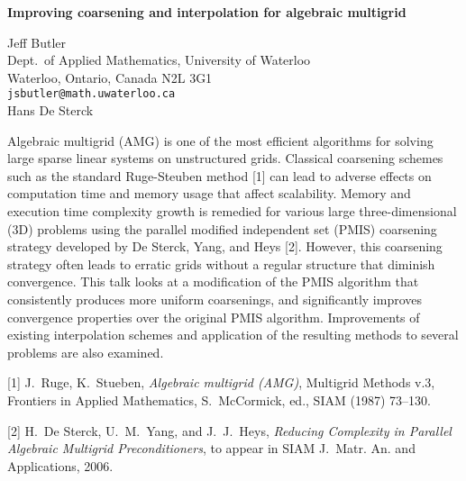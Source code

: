 \documentclass{report}
\begin{document}

\begin{center}
{\large
{\bf Improving coarsening and interpolation for algebraic multigrid}}

	Jeff Butler \\
	Dept.~of Applied Mathematics, University of Waterloo \\
	Waterloo, Ontario, Canada N2L 3G1 \\
	{\tt jsbutler@math.uwaterloo.ca} \\
	Hans De Sterck
\end{center}
Algebraic multigrid (AMG) is one of the most efficient
algorithms for solving large sparse linear systems on
unstructured grids. Classical coarsening schemes such as the
standard Ruge-Steuben method [1] can lead to adverse effects
on computation time and memory usage that affect
scalability. Memory and execution time complexity growth is
remedied for various large three-dimensional (3D) problems
using the parallel modified independent set (PMIS)
coarsening strategy developed by De Sterck, Yang, and Heys
[2]. However, this coarsening strategy often leads to
erratic grids without a regular structure that diminish
convergence. This talk looks at a modification of the PMIS
algorithm that consistently produces more uniform
coarsenings, and significantly improves convergence
properties over the original PMIS algorithm. Improvements of
existing interpolation schemes and application of the
resulting methods to several problems are also examined.

[1] J.~Ruge, K.~Stueben, {\em Algebraic multigrid (AMG)},
Multigrid Methods v.3, Frontiers in Applied Mathematics,
S.~McCormick, ed., SIAM (1987) 73--130.

[2] H.~De Sterck, U.~M.~Yang, and J.~J.~Heys,
{\em Reducing Complexity in Parallel Algebraic
Multigrid Preconditioners}, to appear in
SIAM J.~Matr. An. and Applications, 2006.



\end{document}
